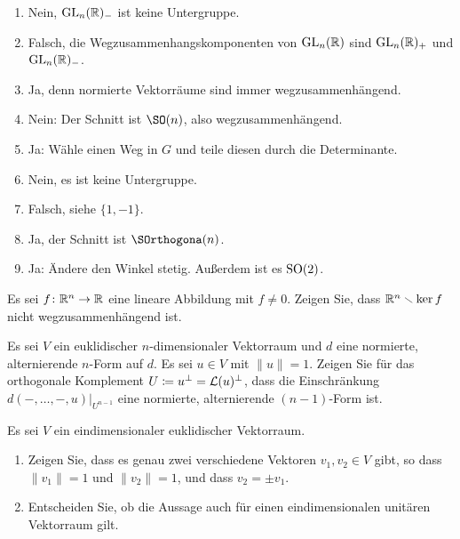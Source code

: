 \begin{solution}
  \begin{enumerate}
    \item
      Nein, $\operatorname{GL}_n(\mathbb{R})_-$ ist keine Untergruppe.
    \item
      Falsch, die Wegzusammenhangskomponenten von $\operatorname{GL}_n(\mathbb{R})$ sind $\operatorname{GL}_n(\mathbb{R})_+$ und $\operatorname{GL}_n(\mathbb{R})_-$.
    \item
      Ja, denn normierte Vektorräume sind immer wegzusammenhängend.
    \item
      Nein: Der Schnitt ist $\SO(n)$, also wegzusammenhängend.
    \item
      Ja: Wähle einen Weg in $G$ und teile diesen durch die Determinante.
    \item
      Nein, es ist keine Untergruppe.
    \item
      Falsch, siehe $\{1,-1\}$.
    \item
      Ja, der Schnitt ist $\SOrthogona(n)$.
    \item
      Ja: Ändere den Winkel stetig.
      Außerdem ist es $\operatorname{SO}(2)$.
  \end{enumerate}
\end{solution}


\begin{question}
  Es sei $f \colon \mathbb{R}^n \to \mathbb{R}$ eine lineare Abbildung mit $f \neq 0$.
  Zeigen Sie, dass $\mathbb{R}^n \smallsetminus \ker f$ nicht wegzusammenhängend ist.
\end{question}


\begin{question}
  Es sei $V$ ein euklidischer $n$-dimensionaler Vektorraum und $d$ eine normierte, alternierende $n$-Form auf $d$.
  Es sei $u \in V$ mit $\|u\| = 1$.
  Zeigen Sie für das orthogonale Komplement $U \coloneqq u^\perp = \operatorname{\mathcal{L}}(u)^\perp$, dass die Einschränkung $d(-, \dotsc, -, u)|_{U^{n-1}}$ eine normierte, alternierende $(n-1)$-Form ist.
\end{question}


\begin{question}
  Es sei $V$ ein eindimensionaler euklidischer Vektorraum.
  \begin{enumerate}[leftmargin=*]
    \item
      Zeigen Sie, dass es genau zwei verschiedene Vektoren $v_1, v_2 \in V$ gibt, so dass $\|v_1\| = 1$ und $\|v_2\| = 1$, und dass $v_2 = \pm v_1$.
    \item
      Entscheiden Sie, ob die Aussage auch für einen eindimensionalen unitären Vektorraum gilt.
  \end{enumerate}
\end{question}


